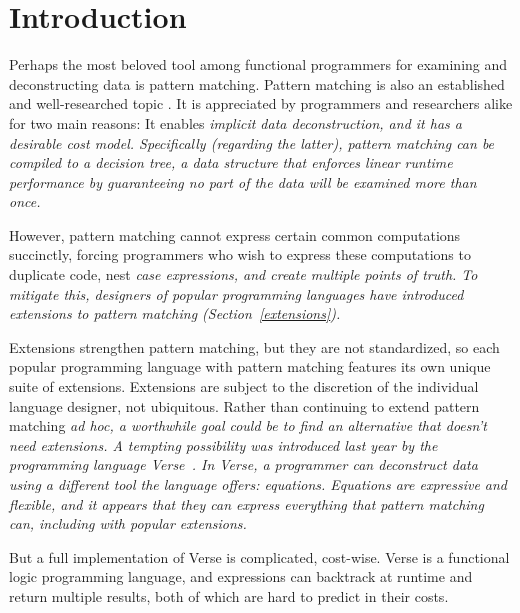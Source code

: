 \documentclass[manuscript,screen,review, 12pt, nonacm]{acmart}
\begin{document}
\section{Introduction}

Perhaps the most beloved tool among functional programmers for examining and
deconstructing data is pattern matching. 
Pattern matching is also an established and well-researched topic
\citep{wadler1987views, macqueen1985tree, burton1993pattern, palao1996new,
maranget, bpc}. It is appreciated by programmers and researchers alike for two
main reasons: It enables \it{implicit} data deconstruction, and it has a
desirable cost model. Specifically (regarding the latter), pattern matching can
be compiled to a \it{decision tree}, a data structure that enforces linear
runtime performance by guaranteeing no part of the data will be examined more
than once.~\citep{maranget}

However, pattern matching cannot express certain common computations succinctly,
forcing programmers who wish to express these computations to duplicate code,
nest \it{case} expressions, and create multiple points of truth. To mitigate
this, designers of popular programming languages have introduced \it{extensions}
to pattern matching (Section~\ref{extensions}). 

Extensions strengthen pattern matching, but they are not standardized, so each
popular programming language with pattern matching features its own unique suite
of extensions. Extensions are subject to the discretion of the individual
language designer, not ubiquitous. Rather than continuing to extend pattern
matching \it{ad hoc}, a worthwhile goal could be to find an alternative that
doesn't need extensions. A tempting possibility was introduced last year by the
programming language Verse~\citep{verse}. In Verse, a programmer can deconstruct
data using a different tool the language offers: \it{equations}. Equations are
expressive and flexible, and it appears that they can express everything that
pattern matching can, including with popular extensions. 

But a full implementation of Verse is complicated, cost-wise. Verse is a
functional logic programming language, and expressions can backtrack at runtime
and return multiple results, both of which are hard to predict in their costs. 

\end{document}
